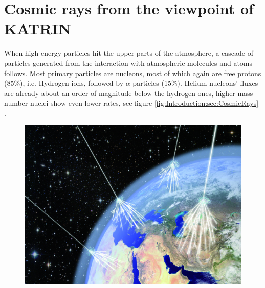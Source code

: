 	\section{Cosmic rays from the viewpoint of KATRIN}
    \label{ch:Introduction:sec:Cosmic Air Showers}
    When high energy particles hit the upper parts of the atmosphere, a cascade of particles generated from the interaction with atmospheric molecules and atoms follows. Most primary particles are nucleons, most of which again are free protons (85\%), i.e. Hydrogen ions, followed by $\alpha$ particles (15\%). Helium nucleons' fluxes are already about an order of magnitude below the hydrogen ones, higher mass number nuclei show even lower rates, see figure \ref{fig:Introduction:sec:CosmicRays} \cite{highEnergyCosmicRays}.
    \begin{figure}
	\begin{minipage}[d]{0.49 \textwidth}
		  \includegraphics[width=\textwidth]{graphics/cosmicRays/cosmicRays.jpg}
	\end{minipage}
	\begin{minipage}[d]{0.49 \textwidth}

\end{minipage}
\end{figure}
